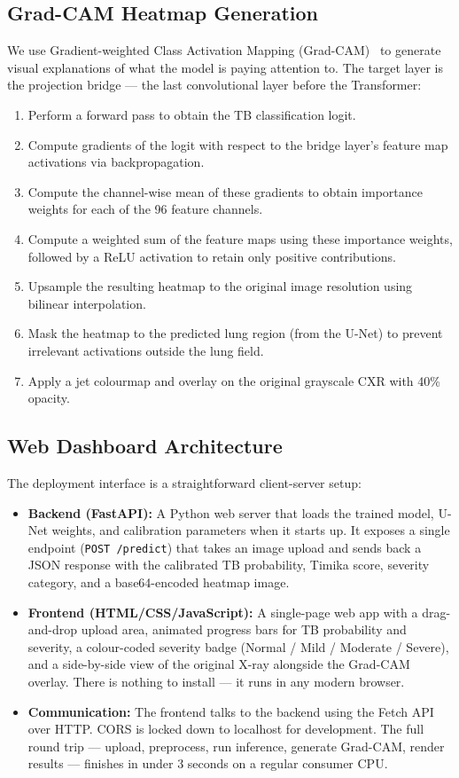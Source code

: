 \documentclass[12pt]{report}
\begin{document}
\subsection{Grad-CAM Heatmap Generation}
We use Gradient-weighted Class Activation Mapping (Grad-CAM)~\cite{ref12} to generate visual explanations of what the model is paying attention to. The target layer is the projection bridge --- the last convolutional layer before the Transformer:
\begin{enumerate}
    \item Perform a forward pass to obtain the TB classification logit.
    \item Compute gradients of the logit with respect to the bridge layer's feature map activations via backpropagation.
    \item Compute the channel-wise mean of these gradients to obtain importance weights for each of the 96 feature channels.
    \item Compute a weighted sum of the feature maps using these importance weights, followed by a ReLU activation to retain only positive contributions.
    \item Upsample the resulting heatmap to the original image resolution using bilinear interpolation.
    \item Mask the heatmap to the predicted lung region (from the U-Net) to prevent irrelevant activations outside the lung field.
    \item Apply a jet colourmap and overlay on the original grayscale CXR with 40\% opacity.
\end{enumerate}

\subsection{Web Dashboard Architecture}
The deployment interface is a straightforward client-server setup:

\begin{itemize}
    \item \textbf{Backend (FastAPI):} A Python web server that loads the trained model, U-Net weights, and calibration parameters when it starts up. It exposes a single endpoint (\texttt{POST /predict}) that takes an image upload and sends back a JSON response with the calibrated TB probability, Timika score, severity category, and a base64-encoded heatmap image.

    \item \textbf{Frontend (HTML/CSS/JavaScript):} A single-page web app with a drag-and-drop upload area, animated progress bars for TB probability and severity, a colour-coded severity badge (Normal / Mild / Moderate / Severe), and a side-by-side view of the original X-ray alongside the Grad-CAM overlay. There is nothing to install --- it runs in any modern browser.

    \item \textbf{Communication:} The frontend talks to the backend using the Fetch API over HTTP. CORS is locked down to localhost for development. The full round trip --- upload, preprocess, run inference, generate Grad-CAM, render results --- finishes in under 3 seconds on a regular consumer CPU.
\end{itemize}
\end{document}
